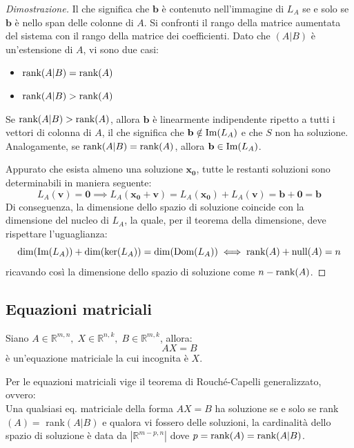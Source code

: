 \documentclass{article}
\begin{document}
\begin{proof}[Dimostrazione]
        \vspace{10pt}
        Il che significa che $\mathbf{b}$ è contenuto nell'immagine di $L_A$ se e solo se $\mathbf{b}$ è nello span delle colonne di $A$.
        Si confronti il rango della matrice aumentata del sistema con il rango della matrice dei coefficienti. Dato che $(A | B)$ è un'estensione di $A$, vi sono due casi: 
        \begin{itemize}
            \item $\textnormal{rank}{(A | B)} = \textnormal{rank}(A)$ 
            \item $\textnormal{rank}{(A | B)} > \textnormal{rank}(A)$ 
        \end{itemize}
        Se $\textnormal{rank}{(A | B)} > \textnormal{rank}(A)$, allora $\mathbf{b}$ è linearmente indipendente ripetto a tutti i vettori di colonna di $A$, il che significa
        che $\mathbf{b} \notin \textnormal{Im}(L_A)$ e che $S$ non ha soluzione. Analogamente, se $\textnormal{rank}{(A | B)} = \textnormal{rank}(A)$, allora $\mathbf{b} \in \textnormal{Im}(L_A)$.

        \vspace{10pt}
        Appurato che esista almeno una soluzione $\mathbf{x_0}$, tutte le restanti soluzioni sono determinabili in maniera seguente:
        \[
            L_A(\mathbf{v}) = \mathbf{0} \implies L_A(\mathbf{x_0} + \mathbf{v}) = L_A(\mathbf{x_0}) + L_A(\mathbf{v}) = \mathbf{b} + \mathbf{0} = \mathbf{b}
        \]
        Di conseguenza, la dimensione dello spazio di soluzione coincide con la dimensione del nucleo di $L_A$, la quale, per il teorema della dimensione, deve rispettare l'uguaglianza:
        \[
            \dim(\textnormal{Im}(L_A)) + \dim(\ker(L_A)) = \dim(\textnormal{Dom}(L_A)) \iff \textnormal{rank}(A) + \textnormal{null}(A) = n
        \] 
        ricavando così la dimensione dello spazio di soluzione come $n - \textnormal{rank}(A)$.  
    \end{proof}




\subsection{Equazioni matriciali}
    Siano $A \in \mathbb{R}^{m, n}, \; X \in \mathbb{R}^{n, k}, \; B \in \mathbb{R}^{m, k}$, allora:
    \[
        AX = B
    \]
    è un'equazione matriciale la cui incognita è $X$.

    \vspace{10pt}
    Per le equazioni matriciali vige il teorema di Rouché-Capelli generalizzato, ovvero: \\
    Una qualsiasi eq. matriciale della forma $AX = B$ ha soluzione se e solo se rank$(A) = $ rank$(A | B)$ e qualora vi fossero delle soluzioni, la cardinalità dello 
    spazio di soluzione è data da $|\mathbb{R}^{m - p, n}|$ dove $p = \textnormal{rank}(A) = \textnormal{rank}(A | B)$.
\end{document}

